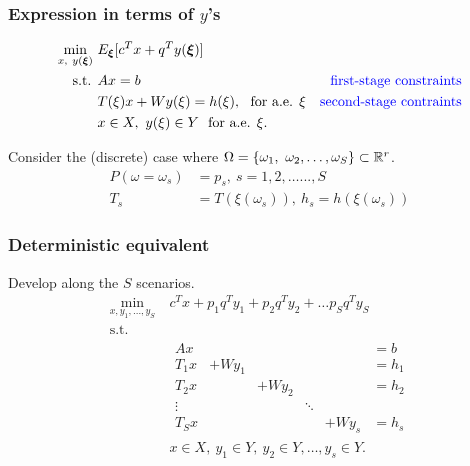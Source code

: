 \documentclass{beamer}
\def\bxi{\boldsymbol\xi}
\def\bxi{\boldsymbol\xi}
\begin{document}
\begin{frame}
	\frametitle{Expression in terms of $y$'s}
	
	\begin{align*}
	\min_{x,\ y(\bxi)}\ & E_{\bxi} [ c^T x + q^T y(\bxi) ] \\
	\mbox{s.t. } & Ax = b & \mbox{\textcolor{blue}{first-stage constraints}} \\
	& T(\xi)x + Wy(\xi) = h(\xi),\ \text{ for a.e. } \xi &
	\mbox{\textcolor{blue}{second-stage contraints}} \\
	& x \in X,\ y(\xi) \in Y\ \text{ for a.e. } \xi.
	\end{align*}
	
	\mbox{}
	
	Consider the (discrete) case where $\Omega = \lbrace \omega_1,\
	\omega_2,\ldots,\omega_S \rbrace \subset {\mathbb{R}}^r$.
	\begin{align*}
	P(\omega = \omega_s) & = p_s,\ s = 1, 2,\ldots . . . , S \\
	T_s & = T (\xi(\omega_s)),\ h_s = h(\xi(\omega_s)) 
	\end{align*}
	
\end{frame}

\begin{frame}
	\frametitle{Deterministic equivalent}
	
	Develop along the $S$ scenarios.
	\begin{align*}
	\min_{x, y_1, \ldots, y_S}\ & c^T x + p_1 q^T y_1 + p_2 q^T y_2 + \ldots
	p_S q^Ty_S \\
	\mbox{s.t. } & \\
	& \begin{matrix} Ax & & & & & = b\\
	T_1 x & + W y_1 & & & & = h_1 \\
	T_2 x & & + W y_2 & & & = h_2 \\
	\vdots & & & \ddots & \\
	T_S x & & & & + W y_s & = h_s
	\end{matrix} \\
	& x \in X,\ y_1 \in Y,\ y_2 \in Y,\ldots, y_s \in Y.
	\end{align*}
	
\end{frame}
\end{document}
